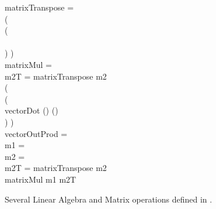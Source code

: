\begin{figure}[t]
\begin{minipage}{.75\textwidth}
 matrixTranspose =  
\\
\tabt
{}(
\\
\tabt \tabt {}(
\\
\tabt \tabt \tabt {}
\\
\tabt ) )
\\
 matrixMul =  
\\
\tabt {} m2T = matrixTranspose m2
\\
\tabt
{}(
\\
\tabt \tabt {}(
\\
\tabt \tabt \tabt vectorDot () ()
\\
\tabt ) )
\\
 vectorOutProd = 
\\
\tabt {} m1 =  %
\\
\tabt {} m2 =  %
\\
\tabt {} m2T = matrixTranspose m2
\\
\tabt matrixMul m1 m2T
\\
\end{minipage}\hfill
\caption{Several Linear Algebra and Matrix operations defined in \lafsharp{}.}
\label{fig:smooth_lib}
\end{figure}